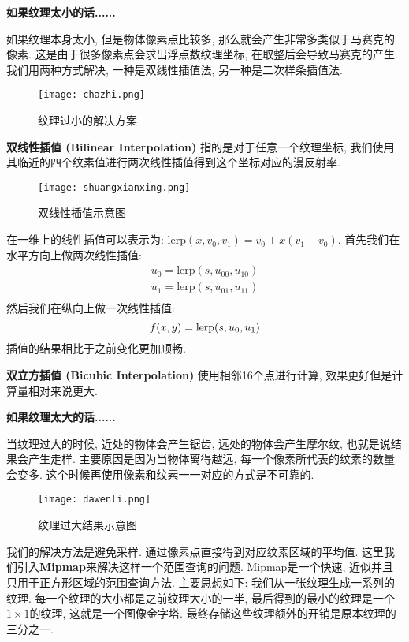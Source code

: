 \documentclass[openany]{progbookcn}
\begin{document}
\textbf{如果纹理太小的话......}

如果纹理本身太小, 但是物体像素点比较多, 那么就会产生非常多类似于马赛克的像素. 这是由于很多像素点会求出浮点数纹理坐标, 在取整后会导致马赛克的产生. 我们用两种方式解决, 一种是双线性插值法, 另一种是二次样条插值法. 
\begin{figure}[H]
	\centering
	\texttt{[image: chazhi.png]}
	\caption{纹理过小的解决方案}
	\label{fig:chazhi}
\end{figure}

\textbf{双线性插值 (Bilinear Interpolation) }指的是对于任意一个纹理坐标, 我们使用其临近的四个纹素值进行两次线性插值得到这个坐标对应的漫反射率. 

\begin{figure}[H]
	\centering
	\texttt{[image: shuangxianxing.png]}
	\caption{双线性插值示意图}
	\label{fig:shuangxianxing}
\end{figure}
在一维上的线性插值可以表示为: $\text{lerp}(x,v_0,v_1)=v_0+x(v_1-v_0)$. 首先我们在水平方向上做两次线性插值: 
\begin{equation}
	\begin{split}
		u_0 = \text{lerp}(s,u_{00},u_{10})\\
		u_1 = \text{lerp}(s,u_{01},u_{11})\\
	\end{split}
\end{equation}
然后我们在纵向上做一次线性插值: 
\begin{equation}
		f(x,y) = \text{lerp}(s,u_{0},u_{1})\\
\end{equation}
插值的结果相比于之前变化更加顺畅. 

\textbf{双立方插值 (Bicubic Interpolation) }使用相邻16个点进行计算, 效果更好但是计算量相对来说更大. 

\textbf{如果纹理太大的话......}

当纹理过大的时候, 近处的物体会产生锯齿, 远处的物体会产生摩尔纹, 也就是说结果会产生走样. 主要原因是因为当物体离得越远, 每一个像素所代表的纹素的数量会变多. 这个时候再使用像素和纹素一一对应的方式是不可靠的. 
\begin{figure}[H]
	\centering
	\texttt{[image: dawenli.png]}
	\caption{纹理过大结果示意图}
	\label{fig:dawenli}
\end{figure}
我们的解决方法是避免采样. 通过像素点直接得到对应纹素区域的平均值. 这里我们引入\textbf{Mipmap}来解决这样一个范围查询的问题. Mipmap是一个快速, 近似并且只用于正方形区域的范围查询方法. 主要思想如下: 我们从一张纹理生成一系列的纹理. 每一个纹理的大小都是之前纹理大小的一半, 最后得到的最小的纹理是一个$1\times 1$的纹理, 这就是一个图像金字塔. 最终存储这些纹理额外的开销是原本纹理的三分之一. 
\end{document}
